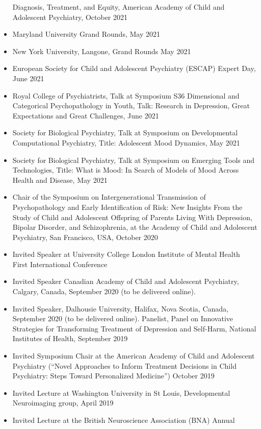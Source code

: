 \documentclass[
]{article}
\begin{document}
\begin{itemize}
  Diagnosis, Treatment, and Equity, American Academy of Child and
  Adolescent Psychiatry, October 2021
\item
  Maryland University Grand Rounds, May 2021
\item
  New York University, Langone, Grand Rounds May 2021
\item
  European Society for Child and Adolescent Psychiatry (ESCAP) Expert
  Day, June 2021
\item
  Royal College of Psychiatrists, Talk at Symposium S36 Dimensional and
  Categorical Psychopathology in Youth, Talk: Research in Depression,
  Great Expectations and Great Challenges, June 2021
\item
  Society for Biological Psychiatry, Talk at Symposium on Developmental
  Computational Psychiatry, Title: Adolescent Mood Dynamics, May 2021
\item
  Society for Biological Psychiatry, Talk at Symposium on Emerging Tools
  and Technologies, Title: What is Mood: In Search of Models of Mood
  Across Health and Disease, May 2021
\item
  Chair of the Symposium on Intergenerational Transmission of
  Psychopathology and Early Identification of Risk: New Insights From
  the Study of Child and Adolescent Offspring of Parents Living With
  Depression, Bipolar Disorder, and Schizophrenia, at the Academy of
  Child and Adolescent Psychiatry, San Francisco, USA, October 2020
\item
  Invited Speaker at University College London Institute of Mental
  Health First International Conference
\item
  Invited Speaker Canadian Academy of Child and Adolescent Psychiatry,
  Calgary, Canada, September 2020 (to be delivered online).
\item
  Invited Speaker, Dalhousie University, Halifax, Nova Scotia, Canada,
  September 2020 (to be delivered online). Panelist, Panel on Innovative
  Strategies for Transforming Treatment of Depression and Self-Harm,
  National Institutes of Health, September 2019
\item
  Invited Symposium Chair at the American Academy of Child and
  Adolescent Psychiatry (``Novel Approaches to Inform Treatment
  Decisions in Child Psychiatry: Steps Toward Personalized Medicine'')
  October 2019
\item
  Invited Lecture at Washington University in St Louis, Developmental
  Neuroimaging group, April 2019
\item
  Invited Lecture at the British Neuroscience Association (BNA) Annual

\end{itemize}
\end{document}
